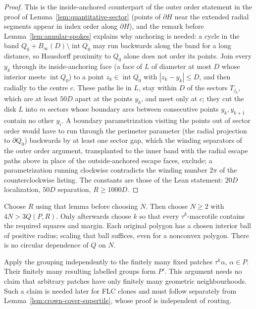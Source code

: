 \begin{proof}
This is the inside-anchored counterpart of the outer order statement in the
proof of Lemma~\ref{lem:quantitative-sector} (points of $\partial H$ near
the extended radial segments appear in index order along $\partial H$), and
the remark before Lemma~\ref{lem:annular-spokes} explains why anchoring is
needed: a cycle in the band $Q_0+B_\infty(D)\setminus\operatorname{int}Q_0$
may run backwards along the band for a long distance, so Hausdorff proximity
to $Q_0$ alone does not order its points.  Join every $y_k$ through its
inside-anchoring face (a face of $L$ of diameter at most $D$ whose interior
meets $\operatorname{int}Q_0$) to a point $z_k\in\operatorname{int}Q_0$ with
$|z_k-y_k|\le D$, and then radially to the centre $c$.  These paths lie in
$L$, stay within $D$ of the sectors $T_{j_k}$, which are at least $50D$
apart at the points $y_k$, and meet only at $c$; they cut the disk $L$ into
$m$ sectors whose boundary arcs between consecutive points $y_k,y_{k+1}$
contain no other $y_i$.  A boundary parametrization visiting the points out
of sector order would have to run through the perimeter parameter (the
radial projection to $\partial Q_0$) backwards by at least one sector gap,
which the winding separators of the outer order argument, transplanted to
the inner band with the radial escape paths above in place of the
outside-anchored escape faces, exclude; a parametrization running clockwise
contradicts the winding number $2\pi$ of the counterclockwise listing.  The
constants are those of the Lean statement: $20D$ localization, $50D$
separation, $R\ge1000D$.
\end{proof}

Choose $R$ using that lemma before choosing $N$.  Then choose $N\ge2$ with
$4N>3Q(P,R)$.  Only afterwards choose $k$ so that every $\tau^k$-macrotile
contains the required squares and margin.  Each original polygon has a
chosen interior ball of positive radius; scaling that ball suffices, even
for a nonconvex polygon.  There is no circular dependence of $Q$ on $N$.

Apply the grouping independently to the finitely many fixed patches
$\tau^k\alpha$, $\alpha\in P$.  Their finitely many resulting labelled
groups form $P'$.  This argument needs no claim that arbitrary patches have
only finitely many geometric neighbourhoods.  Such a claim is needed later
for FLC clones and must follow separately from
Lemma~\ref{lem:crown-cover-supertile}, whose proof is independent of routing.

